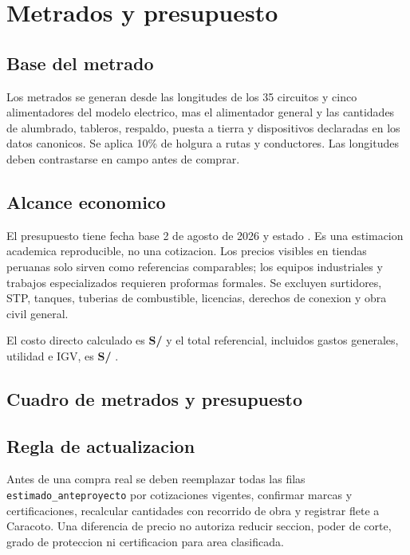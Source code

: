 \chapter{Metrados y presupuesto}
\thispagestyle{memoria}\pagestyle{memoria}

\section{Base del metrado}
Los metrados se generan desde las longitudes de los 35 circuitos y cinco
alimentadores del modelo electrico, mas el alimentador general y las cantidades
de alumbrado, tableros, respaldo, puesta a tierra y dispositivos declaradas en
los datos canonicos. Se aplica 10\% de holgura a rutas y conductores. Las
longitudes deben contrastarse en campo antes de comprar.

\section{Alcance economico}
El presupuesto tiene fecha base 2 de agosto de 2026 y estado
\textbf{\EstadoPresupuesto}. Es una estimacion academica reproducible, no una
cotizacion. Los precios visibles en tiendas peruanas solo sirven como referencias
comparables; los equipos industriales y trabajos especializados requieren
proformas formales. Se excluyen surtidores, STP, tanques, tuberias de combustible,
licencias, derechos de conexion y obra civil general.

El costo directo calculado es \textbf{S/ \CostoDirecto} y el total referencial,
incluidos gastos generales, utilidad e IGV, es \textbf{S/ \PresupuestoTotal}.

\section{Cuadro de metrados y presupuesto}
\footnotesize

\normalsize

\section{Regla de actualizacion}
Antes de una compra real se deben reemplazar todas las filas
\texttt{estimado\_anteproyecto} por cotizaciones vigentes, confirmar marcas y
certificaciones, recalcular cantidades con recorrido de obra y registrar flete a
Caracoto. Una diferencia de precio no autoriza reducir seccion, poder de corte,
grado de proteccion ni certificacion para area clasificada.


